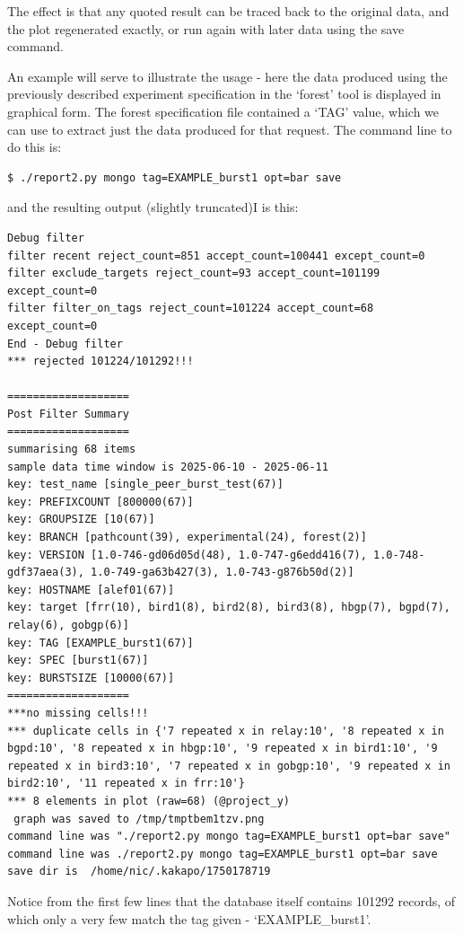  The effect is that any quoted result can be traced back to the original data, and the plot regenerated exactly, or run again with later data using the save command.

 An example will serve to illustrate the usage - here the data produced using the previously described experiment specification in the `forest' tool is displayed in graphical form.
 The forest specification file contained a `TAG' value, which we can use to extract just the data produced for that request.  The command line to do this is:

\begin{lstlisting}
$ ./report2.py mongo tag=EXAMPLE_burst1 opt=bar save
\end{lstlisting}
 and the resulting output (slightly truncated)I is this:

\begin{lstlisting}
Debug filter
filter recent reject_count=851 accept_count=100441 except_count=0
filter exclude_targets reject_count=93 accept_count=101199 except_count=0
filter filter_on_tags reject_count=101224 accept_count=68 except_count=0
End - Debug filter
*** rejected 101224/101292!!!

===================
Post Filter Summary
===================
summarising 68 items
sample data time window is 2025-06-10 - 2025-06-11
key: test_name [single_peer_burst_test(67)]
key: PREFIXCOUNT [800000(67)]
key: GROUPSIZE [10(67)]
key: BRANCH [pathcount(39), experimental(24), forest(2)]
key: VERSION [1.0-746-gd06d05d(48), 1.0-747-g6edd416(7), 1.0-748-gdf37aea(3), 1.0-749-ga63b427(3), 1.0-743-g876b50d(2)]
key: HOSTNAME [alef01(67)]
key: target [frr(10), bird1(8), bird2(8), bird3(8), hbgp(7), bgpd(7), relay(6), gobgp(6)]
key: TAG [EXAMPLE_burst1(67)]
key: SPEC [burst1(67)]
key: BURSTSIZE [10000(67)]
===================
***no missing cells!!!
*** duplicate cells in {'7 repeated x in relay:10', '8 repeated x in bgpd:10', '8 repeated x in hbgp:10', '9 repeated x in bird1:10', '9 repeated x in bird3:10', '7 repeated x in gobgp:10', '9 repeated x in bird2:10', '11 repeated x in frr:10'}
*** 8 elements in plot (raw=68) (@project_y)
 graph was saved to /tmp/tmptbem1tzv.png
command line was "./report2.py mongo tag=EXAMPLE_burst1 opt=bar save"
command line was ./report2.py mongo tag=EXAMPLE_burst1 opt=bar save
save dir is  /home/nic/.kakapo/1750178719

\end{lstlisting}    

 Notice from the first few lines that the database itself contains 101292 records, of which only a very few match the tag given - `EXAMPLE_burst1'.

